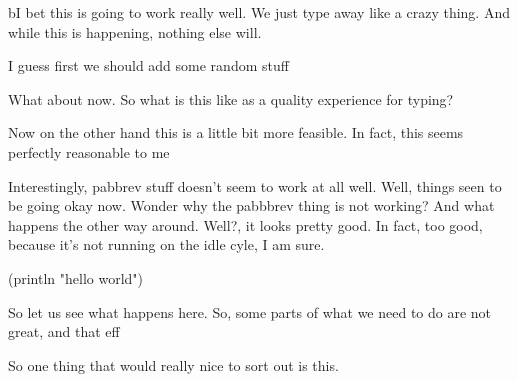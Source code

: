 bI bet this is going to work really well.  We just type away like a crazy
thing. And while this is happening, nothing else will.

I guess first we should add some random stuff

What about now. So what is this like as a quality experience for typing?

Now on the other hand this is a little bit more feasible. In fact, this
seems perfectly reasonable to me

Interestingly, pabbrev stuff doesn't seem to work at all well.
Well, things seen to be going okay now. Wonder why the pabbbrev thing is
not working? And what happens the other way around. Well?, it looks pretty
good. In fact, too good, because it's not running on the idle cyle, I am sure. 

\begin{code}
(println "hello world")
\end{code}

So let us see what happens here. So, some parts of what we need to do are
not great, and that eff

So one thing that would really nice to sort out is this.

